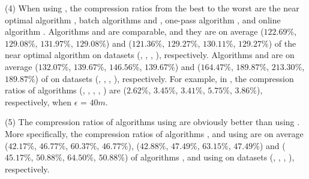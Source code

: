 \sstab (4) When using \sed, the compression ratios from the best
to the worst are the near optimal algorithm \nopts, batch algorithms \tpa and
\dpa, one-pass algorithm \cised, and online algorithm \squishe. Algorithms \tpa
and \dpa are comparable, and they are on average
($122.69\%$, $129.08\%$, $131.97\%$, $129.08\%$) and ($121.36\%$, $129.27\%$, $130.11\%$, $129.27\%$)
 of the near optimal algorithm \nopts on datasets (\ucar, \geolife, \mopsi,
 \act), respectively.
 Algorithms \cised and \squishe are on average ($132.07\%$, $139.67\%$,
 $146.56\%$, $139.67\%$) and ($164.47\%$, $189.87\%$, $213.30\%$, $189.87\%$)
 of \nopts on datasets (\ucar, \geolife, \mopsi, \act), respectively.
For example, in \mopsi, the compression ratios of algorithms
(\nopts, \tpa, \dpa, \squishe, \cised)
are ($2.62\%$, $3.45\%$, $3.41\%$, $5.75\%$, $3.86\%$), respectively, when $\epsilon$ = $40m$. 

\sstab (5) The compression ratios of algorithms using \ped are obviously better
than using \sed.
More specifically, the compression ratios of algorithms \optp, \tpa and \dpa
using \ped are on average ($42.17\%$, $46.77\%$, $60.37\%$, $46.77\%$),
($42.88\%$, $47.49\%$, $63.15\%$, $47.49\%$) and ($45.17\%$, $50.88\%$, $64.50\%$,
$50.88\%$) of algorithms \nopts, \tpa and \dpa using \sed on datasets (\ucar, \geolife, \mopsi, \act), respectively.
	





